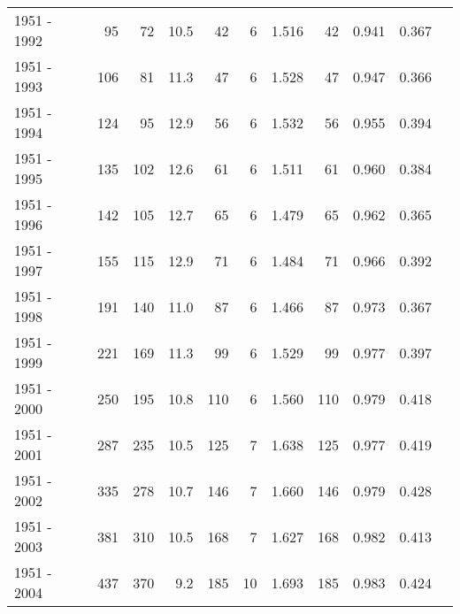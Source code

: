 \begin{tabular}{lrrrrrrrrrr}
1951 - 1992 &       95 &       72 &   10.5 &                      42 &                          6 &       1.516 &             42 &       0.941 &             0.367 \\
1951 - 1993 &      106 &       81 &   11.3 &                      47 &                          6 &       1.528 &             47 &       0.947 &             0.366 \\
1951 - 1994 &      124 &       95 &   12.9 &                      56 &                          6 &       1.532 &             56 &       0.955 &             0.394 \\
1951 - 1995 &      135 &      102 &   12.6 &                      61 &                          6 &       1.511 &             61 &       0.960 &             0.384 \\
1951 - 1996 &      142 &      105 &   12.7 &                      65 &                          6 &       1.479 &             65 &       0.962 &             0.365 \\
1951 - 1997 &      155 &      115 &   12.9 &                      71 &                          6 &       1.484 &             71 &       0.966 &             0.392 \\
1951 - 1998 &      191 &      140 &   11.0 &                      87 &                          6 &       1.466 &             87 &       0.973 &             0.367 \\
1951 - 1999 &      221 &      169 &   11.3 &                      99 &                          6 &       1.529 &             99 &       0.977 &             0.397 \\
1951 - 2000 &      250 &      195 &   10.8 &                     110 &                          6 &       1.560 &            110 &       0.979 &             0.418 \\
1951 - 2001 &      287 &      235 &   10.5 &                     125 &                          7 &       1.638 &            125 &       0.977 &             0.419 \\
1951 - 2002 &      335 &      278 &   10.7 &                     146 &                          7 &       1.660 &            146 &       0.979 &             0.428 \\
1951 - 2003 &      381 &      310 &   10.5 &                     168 &                          7 &       1.627 &            168 &       0.982 &             0.413 \\
1951 - 2004 &      437 &      370 &    9.2 &                     185 &                         10 &       1.693 &            185 &       0.983 &             0.424 \\

\end{tabular}
